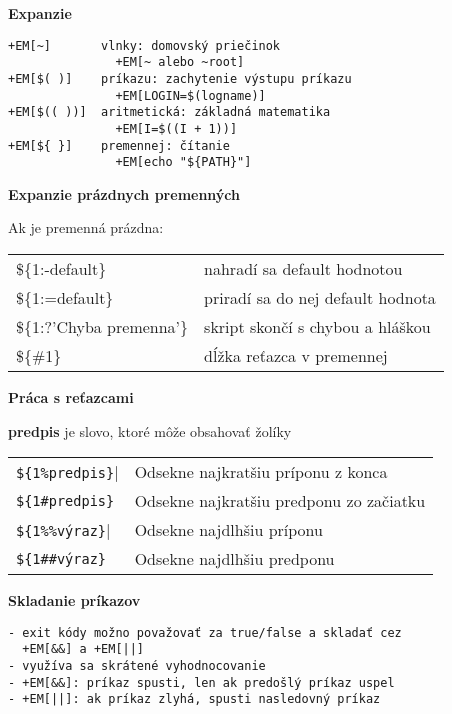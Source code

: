 \documentclass[8pt,landscape]{extarticle}
\newcommand{\Heading}[1]{%
{\begin{center}\bfseries\Large#1\end{center}}%
}%
\newcommand{\Em}[1]{\Ovalbox{#1}}
\newenvironment{karticka}[1]%
{%
\Heading{#1}%
}%
{%
\clearpage
}%
\begin{document}
\begin{karticka}{Expanzie}
\begin{Verbatim}[commandchars=+\[\]]
+EM[~]       vlnky: domovský priečinok
               +EM[~ alebo ~root]
+EM[$( )]    príkazu: zachytenie výstupu príkazu
               +EM[LOGIN=$(logname)]
+EM[$(( ))]  aritmetická: základná matematika
               +EM[I=$((I + 1))]
+EM[${ }]    premennej: čítanie
               +EM[echo "${PATH}"]
\end{Verbatim}
\end{karticka}
\begin{karticka}{Expanzie prázdnych premenných}
Ak je premenná \Em{1} prázdna:
\begin{table}[h!]
\begin{tabular}{lp{4cm}}
\$\{1:-default\}
&   nahradí sa default hodnotou
\\
\$\{1:=default\}
&   priradí sa do nej default hodnota
\\
\$\{1:?'Chyba premenna'\}
&   skript skončí s chybou a hláškou
\\
\$\{\#1\}
&
   dĺžka reťazca v premennej
\end{tabular}
\end{table}
\end{karticka}
\begin{karticka}{Práca s reťazcami}
\textbf{predpis} je slovo, ktoré môže obsahovať žolíky
\begin{table}[h!]
\begin{tabular}{lp{7cm}}
\verb|${1%predpis}|
&
Odsekne najkratšiu príponu z konca
\\[6pt]
\verb|${1#predpis}|
&
Odsekne najkratšiu predponu zo začiatku
\\[6pt]
\verb|${1%%výraz}|
&
Odsekne najdlhšiu príponu
\\[6pt]
\verb|${1##výraz}|
&
Odsekne najdlhšiu predponu
\end{tabular}
\end{table}
\end{karticka}
\begin{karticka}{Skladanie príkazov}
\begin{Verbatim}[commandchars=+\[\]]
- exit kódy možno považovať za true/false a skladať cez
  +EM[&&] a +EM[||]
- využíva sa skrátené vyhodnocovanie
- +EM[&&]: príkaz spusti, len ak predošlý príkaz uspel
- +EM[||]: ak príkaz zlyhá, spusti nasledovný príkaz
\end{Verbatim}
\end{karticka}
\end{document}
